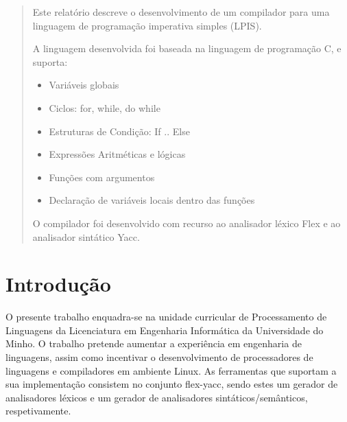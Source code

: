 \documentclass[a4paper,10pt]{report}
\begin{document}


\begin{abstract}
Este relatório descreve o desenvolvimento de um compilador para uma linguagem de programação imperativa simples (LPIS). 

A linguagem desenvolvida foi baseada na linguagem de programação C, e suporta:
\begin{itemize}
  \item Variáveis globais
  \item Ciclos: for, while, do while
  \item Estruturas de Condição: If .. Else
  \item Expressões Aritméticas e lógicas
  \item Funções com argumentos
  \item Declaração de variáveis locais dentro das funções
\end{itemize}
O compilador foi desenvolvido com recurso ao analisador léxico Flex e ao analisador sintático Yacc.

\end{abstract}
\tableofcontents
{}


\chapter{Introdução}
\label{cap:intro}
O presente trabalho enquadra-se na unidade curricular de Processamento de Linguagens da Licenciatura em Engenharia Informática da Universidade do Minho. O trabalho pretende aumentar a experiência em engenharia de linguagens, assim como incentivar o desenvolvimento de processadores de linguagens e compiladores em ambiente Linux. As ferramentas que suportam a sua implementação consistem no conjunto flex-yacc, sendo estes um gerador de analisadores léxicos e um gerador de analisadores sintáticos/semânticos, respetivamente. 
\end{document}
